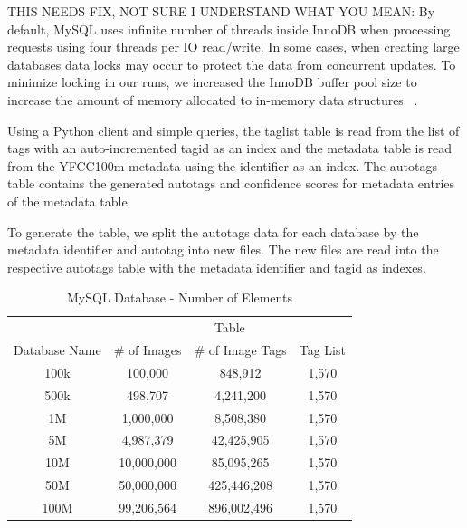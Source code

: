 THIS NEEDS FIX, NOT SURE I UNDERSTAND WHAT YOU MEAN:
By default, MySQL uses infinite number of threads inside InnoDB when processing
requests using four threads per IO read/write.
In some cases, when creating large databases data locks may occur to protect the
data from concurrent updates.
To minimize locking in our runs, we increased the InnoDB buffer pool size to
increase the amount of memory allocated to in-memory data structures
~\cite{mysql,mysql_blog}.

Using a Python client and simple queries, the taglist table is read from the
list of tags with an auto-incremented tagid as an index and the metadata table
is read from the YFCC100m metadata using the identifier as an index.
The autotags table contains the generated autotags and confidence scores for
metadata entries of the metadata table.

To generate the table, we split the autotags data for each database by the
metadata identifier and autotag into new files.
The new files are read into the respective autotags table with the metadata
identifier and tagid as indexes.

\begin{table}[h]
\caption{MySQL Database - Number of Elements}
\centering
\begin{tabular}{c c c c}
\hline\hline
 & \multicolumn{3}{c}{Table}\\
\cline{2-4}
Database Name & \# of Images & \# of Image Tags & Tag List\\
\hline
100k & 100,000    & 848,912     & 1,570\\
500k & 498,707    & 4,241,200   & 1,570\\
1M   & 1,000,000  & 8,508,380   & 1,570\\
5M   & 4,987,379  & 42,425,905  & 1,570\\
10M  & 10,000,000 & 85,095,265  & 1,570\\
50M  & 50,000,000 & 425,446,208 & 1,570\\
100M & 99,206,564 & 896,002,496 & 1,570\\
\hline
\end{tabular}
\label{table:mysqltables}
\end{table}

